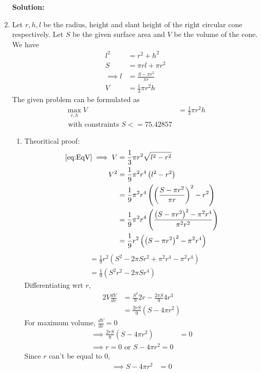 \documentclass[12pt]{article}
\providecommand{\brak}[1]{\ensuremath{\left(#1\right)}}
\newcommand{\solution}{\noindent \textbf{Solution: }}
\begin{document}
\begin{enumerate}
\solution 
\item  Let $r,h,l$ be the radius, height and slant height of the right circular cone respectively. Let $S$ be the given surface area and $V$ be the volume of the cone. We have 
\begin{align}
	l^2 &= r^2 + h^2 \\
	S &= \pi rl + \pi r^2 \\
	\implies l &= \frac{S-\pi r^2}{\pi r}\\
	\label{eq:EqV}
	V &= \frac{1}{3}\pi r^2h 
\end{align}
The given problem can be formulated as 
\begin{align}
	\label{eq:EqMax}
	\max_{r,h} V &= \frac{1}{3}\pi r^2h \\
	\label{eq:EqConstr}
	\text { with constraints } S <= 75.42857 
\end{align}
\begin{enumerate}
\item Theoritical proof:
\begin{align}
	\eqref{eq:EqV} \implies V &= \frac{1}{3}\pi r^2\sqrt{l^2-r^2} \\
	V^2 &= \frac{1}{9}\pi^2 r^4\brak{l^2-r^2} \\
	&= \frac{1}{9}\pi^2 r^4\brak{\brak{\frac{S-\pi r^2}{\pi r}}^2-r^2} \\
	&= \frac{1}{9}\pi^2 r^4\brak{\frac{\brak{S-\pi r^2}^2-\pi^2r^4 }{\pi^2 r^2}} \\
	&= \frac{1}{9} r^2\brak{\brak{S-\pi r^2}^2-\pi^2r^4 }
\end{align}
\begin{align}
	&= \frac{1}{9} r^2\brak{S^2- 2\pi S r^2 + \pi^2r^4 -\pi^2r^4 } \\
	&= \frac{1}{9} \brak{S^2r^2- 2\pi S r^4 } 
\end{align}
Differentiating wrt $r$,
\begin{align}
	\label{eq:EqDer}
	2V \frac{dV}{dr} &= \frac{S^2}{9}2r - \frac{2\pi S}{9}4r^3 \\ 
	&= \frac{2rS}{9}\brak{ S- 4\pi r^2} 
\end{align}
For maximum volume, $\frac{dV}{dr} = 0$
\begin{align}
 	\implies  \frac{2rS}{9}\brak{ S- 4\pi r^2} &= 0 \\ 
	\implies r = 0 \text{ or } S - 4\pi r^2 = 0 
\end{align}
Since $r$ can't be equal to 0,
\begin{align}
	\implies S - 4\pi r^2 &= 0 \\
	\label{eq:EqS}

\end{align}
\end{enumerate}
\end{enumerate}
\end{document}
